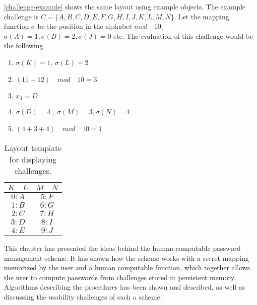 \begin{example}
    \autoref{challenge-example} shows the same layout using example objects. The example challenge is $C = \{A, B, C, D, E, F, G, H, I, J, K, L, M, N\}$. Let the mapping function $\sigma$ be the position in the alphabet $mod \quad 10$, $\sigma(A)=1, \sigma(B)=2, \sigma(J)=0$ etc. The evaluation of this challenge would be the following.
    \begin{enumerate}
        \item $\sigma(K) = 1$, $\sigma(L)=2$
        \item $(11 + 12)\quad mod \quad 10 = 3$
        \item $x_3 = D$
        \item $\sigma(D) = 4$ , $\sigma(M)=3, \sigma(N)=4$
        \item $(4 + 3 + 4)\quad mod\quad 10 = \underline{\underline{1}}$

    \end{enumerate}

    
    \begin{table}[h]
        \centering
        \begin{tabular}{|c c|c|c|}
            \hline
            $K$ & $L$ & $M$ & $N$ \\
            \hline \hline
            \multicolumn{2}{|c|}{$0:A$} & \multicolumn{2}{|c|}{$5:F$}\\
            \multicolumn{2}{|c|}{$1:B$} & \multicolumn{2}{|c|}{$6:G$}\\
            \multicolumn{2}{|c|}{$2:C$} & \multicolumn{2}{|c|}{$7:H$}\\
            \multicolumn{2}{|c|}{$3:D$} & \multicolumn{2}{|c|}{$8:I$}\\
            \multicolumn{2}{|c|}{$4:E$} & \multicolumn{2}{|c|}{$9:J$}\\
            \hline 
        \end{tabular}
        \caption{Layout template for displaying challenges.}
        \label{challenge-example}
    \end{table}


\end{example}

This chapter has presented the ideas behind the human computable password management scheme. It has shown how the scheme works with a secret mapping memorized by the user and a human computable function, which together allows the user to compute passwords from challenges stored in persistent memory. Algorithms describing the procedures has been shown and described, as well as discussing the usability challenges of such a scheme.
